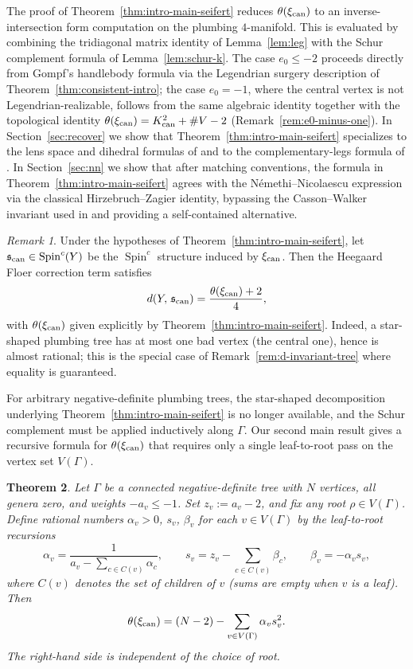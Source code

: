 \documentclass[11pt]{amsart}
\theoremstyle{plain}
\newtheorem{theorem}{Theorem}[section]
\theoremstyle{definition}
\theoremstyle{remark}
\newtheorem{remark}[theorem]{Remark}
\begin{document}
The proof of Theorem~\ref{thm:intro-main-seifert} reduces
$\theta(\xi_{\rm can})$ to an inverse-intersection form computation
on the plumbing $4$-manifold. This is evaluated by combining the
tridiagonal matrix identity of Lemma~\ref{lem:leg} with the Schur
complement formula of Lemma~\ref{lem:schur-k}. The case $e_0\le -2$
proceeds directly from Gompf's handlebody formula via the Legendrian
surgery description of Theorem~\ref{thm:consistent-intro}; the case
$e_0=-1$, where the central vertex is not Legendrian-realizable,
follows from the same algebraic identity together with the
topological identity $\theta(\xi_{\rm can})=K_{\rm can}^2+\#V-2$
(Remark~\ref{rem:e0-minus-one}).
In Section~\ref{sec:recover} we show that
Theorem~\ref{thm:intro-main-seifert} specializes to the lens space
and dihedral formulas of
\cite[Propositions~9.3 and~9.8]{EtnyreOzbagciTosun2025} and to the
complementary-legs formula of
\cite[Proposition~4.4]{EtnyreOzbagciTosun2026}. In
Section~\ref{sec:nn} we show that after matching conventions, the
formula in Theorem~\ref{thm:intro-main-seifert} agrees with the
N\'emethi--Nicolaescu expression
\cite[Section~5.5]{NemethiNicolaescu2002} via the classical
Hirzebruch--Zagier identity, bypassing the Casson--Walker invariant
used in \cite{NemethiNicolaescu2002} and providing a self-contained
alternative.

\begin{remark}\label{rem:d-invariant}
Under the hypotheses of Theorem~\ref{thm:intro-main-seifert}, let
$\mathfrak{s}_{\rm can} \in \operatorname{Spin}^c(Y)$ be the
$\operatorname{Spin}^c$ structure induced by $\xi_{\rm can}$. Then the
Heegaard Floer correction term satisfies
\[
d\!\left(Y,\,\mathfrak{s}_{\rm can}\right)
= \frac{\theta(\xi_{\rm can}) + 2}{4},
\]
with $\theta(\xi_{\rm can})$ given explicitly by
Theorem~\ref{thm:intro-main-seifert}. Indeed, a star-shaped plumbing
tree has at most one bad vertex (the central one), hence is almost
rational; this is the special case of
Remark~\ref{rem:d-invariant-tree} where equality is guaranteed.
\end{remark}

For arbitrary negative-definite plumbing trees, the star-shaped decomposition
underlying Theorem~\ref{thm:intro-main-seifert} is no longer
available, and the Schur complement must be applied inductively
along $\Gamma$. Our second main result gives a recursive formula for
$\theta(\xi_{\rm can})$ that requires only a single leaf-to-root pass
on the vertex set $V(\Gamma)$.

\begin{theorem}\label{thm:intro-main-tree}
Let $\Gamma$ be a connected negative-definite tree with $N$
vertices, all genera zero, and weights $-a_v\le -1$. Set
$z_v:=a_v-2$, and fix any root $\rho\in V(\Gamma)$. Define
rational numbers $\alpha_v>0$, $s_v$, $\beta_v$ for each
$v\in V(\Gamma)$ by the leaf-to-root recursions
\[
\alpha_v=\frac{1}{a_v-\sum_{c\in C(v)}\alpha_c},
\qquad
s_v=z_v-\sum_{c\in C(v)}\beta_c,
\qquad
\beta_v=-\alpha_v s_v,
\]
where $C(v)$ denotes the set of children of $v$ (sums are empty when
$v$ is a leaf). Then
\[
\theta(\xi_{\rm can})
=
(N-2)-\sum_{v\in V(\Gamma)}\alpha_v s_v^2.
\]
The right-hand side is independent of the choice of root.
\end{theorem}
\end{document}
